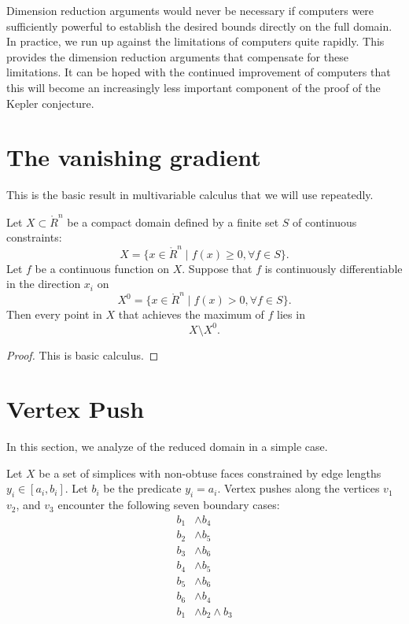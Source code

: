 Dimension reduction arguments would never be necessary if
computers were sufficiently powerful to establish the desired
bounds directly on the full domain.  In practice, we run up
against the limitations of computers quite rapidly.  This \chap
provides the dimension reduction arguments that compensate for
these limitations.  It can be hoped with the continued improvement
of computers that this \chap will become an increasingly less
important component of the proof of the Kepler conjecture.

\section{The vanishing gradient}\label{sec:gradient}

This is the basic result in multivariable calculus that we will
use repeatedly.

\begin{lemma}  Let $X\subset\ring{R}^n$ be a compact domain
defined by a finite set $S$ of continuous constraints:
    $$X =\{x\in\ring{R}^n\mid f(x)\ge 0, \forall f\in S\}.$$
Let $f$ be a continuous function on $X$.  Suppose that $f$ is
continuously differentiable in the direction $x_i$ on
    $$X^0= \{x\in\ring{R}^n\mid f(x) > 0, \forall f\in S\}.$$
Then every point in $X$ that achieves the maximum of $f$ lies in
    $$X \setminus X^0.$$
\end{lemma}

\begin{proof} This is basic calculus.
\end{proof}

\section{Vertex Push}\label{sec:push}

In this section, we analyze of the reduced domain in a simple
case.

\begin{lemma}  Let $X$ be a set of simplices with non-obtuse faces constrained by edge
lengths $y_i\in[a_i,b_i]$.  Let $b_i$ be the predicate $y_i =
a_i$.  Vertex pushes along the vertices $v_1$ $v_2$, and $v_3$
encounter the following seven boundary cases:
    $$
    \begin{array}{rlll}
    b_1 &\land b_4 \\
    b_2 &\land b_5 \\
    b_3 &\land b_6 \\
    b_4 &\land b_5 \\
    b_5 &\land b_6 \\
    b_6 &\land b_4 \\
    b_1 &\land b_2 \land b_3
    \end{array}
    $$
\end{lemma}

